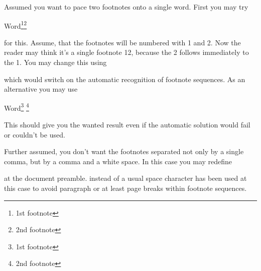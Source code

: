 \ifCommonscrlttr\else
\begin{Example}
  \label{desc:maincls.cmd.footnote.example}%
  Assumed you want to pace two footnotes onto a single word. First you may try
\begin{lstcode}
  Word\footnote{1st footnote}\footnote{2nd footnote}
\end{lstcode}
  for this. Assume, that the footnotes will be numbered with 1 and 2. Now the
  reader may think it's a single footnote 12, because the 2 follows
  immediately to the 1. You may change this using
\begin{lstcode}
\end{lstcode}
  which would switch on the automatic recognition of footnote sequences. As an
  alternative you may use
\begin{lstcode}
  Word\footnote{1st footnote}%
  \multiplefootnoteseparator
  \footnote{2nd footnote}
\end{lstcode}
  This should give you the wanted result even if the automatic solution would
  fail or couldn't be used.

  Further assumed, you don't want the footnotes separated not only by a single
  comma, but by a comma and a white space. In this case you may redefine
\begin{lstcode}
  \renewcommand*{\multfootsep}{,\nobreakspace}
\end{lstcode}
  at the document preamble. 
  instead of a usual space character has been used at this case to avoid
  paragraph or at least page breaks within footnote sequences.
\end{Example}%
\fi%
%
%
%
%
%
%
\fi %


